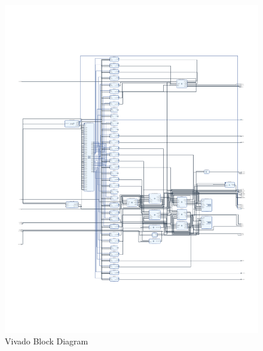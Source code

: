 \begin{figure}[h]
\centerline{\includegraphics[width=1\linewidth]{4-ANC_Sys/VivadoBD.pdf}}
\caption{Vivado Block Diagram}
\label{fig_VivadoBD}
\end{figure}

